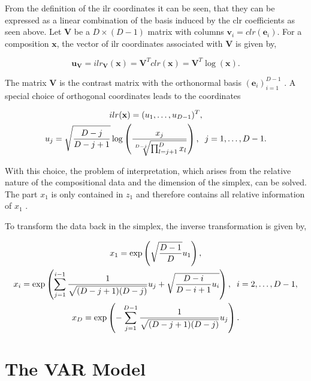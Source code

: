 From the definition of the ilr coordinates it can be seen, that they can be expressed as a linear combination of the basis induced by the clr coefficients as seen above. Let $\textbf{V}$ be a $D \times (D-1)$ matrix with columns $\textbf{v}_i = clr(\textbf{e}_i)$. For a composition $\textbf{x}$, the vector of ilr coordinates associated with $\textbf{V}$ is given by,

\begin{equation}
\textbf{u}_{\textbf{V}} = ilr_{\textbf{V}}(\textbf{x}) = \textbf{V}^T clr(\textbf{x}) = \textbf{V}^T \log(\textbf{x}). 
\label{eq:ilr coordinates with V}
\end{equation}

The matrix $\textbf{V}$ is the contrast matrix with the orthonormal basis $(\textbf{e}_i)_{i=1}^{D-1}$ \cite{Egozcue:2003}. A special choice of orthogonal coordinates leads to the coordinates 

\begin{gather}
ilr(\textbf{x}) = (u_1,\ldots,u_{D-1})^T, \\
u_j = \sqrt{\frac{D-j}{D-j+1}}\log\left(\frac{x_j}{\sqrt[D-j]{\prod_{l=j+1}^D x_l}}\right), \hspace{0.2cm} j=1,\ldots, D-1.
\label{eq:pivot coordinates}
\end{gather}

With this choice, the problem of interpretation, which arises from the relative nature of the compositional data and the dimension of the simplex, can be solved. The part $x_1$ is only contained in $z_1$ and therefore contains all relative information of $x_1$ \cite{Filzmoser:2020}. 

To transform the data back in the simplex, the inverse transformation is given by, 

\begin{gather}
x_1 = \exp\left(\sqrt{\frac{D-1}{D}}u_1\right), \\
x_i = \exp\left( \sum_{j=1}^{i-1}\frac{1}{\sqrt{(D-j+1)(D-j)}}u_j + \sqrt{\frac{D-i}{D-i+1}u_i} \right), \hspace{0.2cm} i=2,\ldots, D-1, \\
x_D = \exp\left(- \sum_{j=1}^{D-1} \frac{1}{\sqrt{(D-j+1)(D-j)}}u_j \right).
\label{eq: Inverse Transformation}
\end{gather}


\section{The VAR Model}
\label{sec:The VAR Model}

